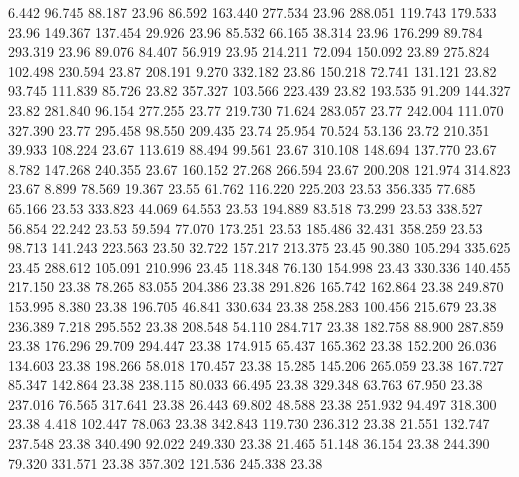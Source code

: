    6.442   96.745   88.187        23.96
  86.592  163.440  277.534        23.96
 288.051  119.743  179.533        23.96
 149.367  137.454   29.926        23.96
  85.532   66.165   38.314        23.96
 176.299   89.784  293.319        23.96
  89.076   84.407   56.919        23.95
 214.211   72.094  150.092        23.89
 275.824  102.498  230.594        23.87
 208.191    9.270  332.182        23.86
 150.218   72.741  131.121        23.82
  93.745  111.839   85.726        23.82
 357.327  103.566  223.439        23.82
 193.535   91.209  144.327        23.82
 281.840   96.154  277.255        23.77
 219.730   71.624  283.057        23.77
 242.004  111.070  327.390        23.77
 295.458   98.550  209.435        23.74
  25.954   70.524   53.136        23.72
 210.351   39.933  108.224        23.67
 113.619   88.494   99.561        23.67
 310.108  148.694  137.770        23.67
   8.782  147.268  240.355        23.67
 160.152   27.268  266.594        23.67
 200.208  121.974  314.823        23.67
   8.899   78.569   19.367        23.55
  61.762  116.220  225.203        23.53
 356.335   77.685   65.166        23.53
 333.823   44.069   64.553        23.53
 194.889   83.518   73.299        23.53
 338.527   56.854   22.242        23.53
  59.594   77.070  173.251        23.53
 185.486   32.431  358.259        23.53
  98.713  141.243  223.563        23.50
  32.722  157.217  213.375        23.45
  90.380  105.294  335.625        23.45
 288.612  105.091  210.996        23.45
 118.348   76.130  154.998        23.43
 330.336  140.455  217.150        23.38
  78.265   83.055  204.386        23.38
 291.826  165.742  162.864        23.38
 249.870  153.995    8.380        23.38
 196.705   46.841  330.634        23.38
 258.283  100.456  215.679        23.38
 236.389    7.218  295.552        23.38
 208.548   54.110  284.717        23.38
 182.758   88.900  287.859        23.38
 176.296   29.709  294.447        23.38
 174.915   65.437  165.362        23.38
 152.200   26.036  134.603        23.38
 198.266   58.018  170.457        23.38
  15.285  145.206  265.059        23.38
 167.727   85.347  142.864        23.38
 238.115   80.033   66.495        23.38
 329.348   63.763   67.950        23.38
 237.016   76.565  317.641        23.38
  26.443   69.802   48.588        23.38
 251.932   94.497  318.300        23.38
   4.418  102.447   78.063        23.38
 342.843  119.730  236.312        23.38
  21.551  132.747  237.548        23.38
 340.490   92.022  249.330        23.38
  21.465   51.148   36.154        23.38
 244.390   79.320  331.571        23.38
 357.302  121.536  245.338        23.38
